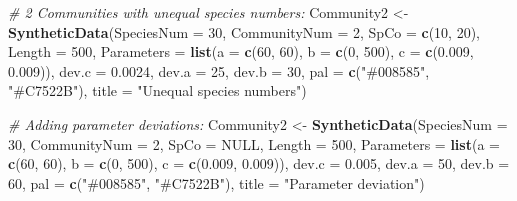 \documentclass[
]{article}
\newenvironment{Shaded}{\begin{snugshade}}{\end{snugshade}}
\newcommand{\CommentTok}[1]{\textcolor[rgb]{0.56,0.35,0.01}{\textit{#1}}}
\newcommand{\DataTypeTok}[1]{\textcolor[rgb]{0.13,0.29,0.53}{#1}}
\newcommand{\DecValTok}[1]{\textcolor[rgb]{0.00,0.00,0.81}{#1}}
\newcommand{\FloatTok}[1]{\textcolor[rgb]{0.00,0.00,0.81}{#1}}
\newcommand{\KeywordTok}[1]{\textcolor[rgb]{0.13,0.29,0.53}{\textbf{#1}}}
\newcommand{\NormalTok}[1]{#1}
\newcommand{\OtherTok}[1]{\textcolor[rgb]{0.56,0.35,0.01}{#1}}
\newcommand{\StringTok}[1]{\textcolor[rgb]{0.31,0.60,0.02}{#1}}
\begin{document}
\begin{Shaded}
\begin{Highlighting}[]
\CommentTok{\# 2 Communities with unequal species numbers:}
\NormalTok{Community2 \textless{}{-}}\StringTok{ }\KeywordTok{SyntheticData}\NormalTok{(}\DataTypeTok{SpeciesNum =} \DecValTok{30}\NormalTok{, }\DataTypeTok{CommunityNum =} \DecValTok{2}\NormalTok{, }\DataTypeTok{SpCo =} \KeywordTok{c}\NormalTok{(}\DecValTok{10}\NormalTok{, }
    \DecValTok{20}\NormalTok{), }\DataTypeTok{Length =} \DecValTok{500}\NormalTok{, }\DataTypeTok{Parameters =} \KeywordTok{list}\NormalTok{(}\DataTypeTok{a =} \KeywordTok{c}\NormalTok{(}\DecValTok{60}\NormalTok{, }\DecValTok{60}\NormalTok{), }\DataTypeTok{b =} \KeywordTok{c}\NormalTok{(}\DecValTok{0}\NormalTok{, }\DecValTok{500}\NormalTok{), }
    \DataTypeTok{c =} \KeywordTok{c}\NormalTok{(}\FloatTok{0.009}\NormalTok{, }\FloatTok{0.009}\NormalTok{)), }\DataTypeTok{dev.c =} \FloatTok{0.0024}\NormalTok{, }\DataTypeTok{dev.a =} \DecValTok{25}\NormalTok{, }\DataTypeTok{dev.b =} \DecValTok{30}\NormalTok{, }\DataTypeTok{pal =} \KeywordTok{c}\NormalTok{(}\StringTok{"\#008585"}\NormalTok{, }
    \StringTok{"\#C7522B"}\NormalTok{), }\DataTypeTok{title =} \StringTok{"Unequal species numbers"}\NormalTok{)}

\CommentTok{\# Adding parameter deviations:}
\NormalTok{Community2 \textless{}{-}}\StringTok{ }\KeywordTok{SyntheticData}\NormalTok{(}\DataTypeTok{SpeciesNum =} \DecValTok{30}\NormalTok{, }\DataTypeTok{CommunityNum =} \DecValTok{2}\NormalTok{, }\DataTypeTok{SpCo =} \OtherTok{NULL}\NormalTok{, }
    \DataTypeTok{Length =} \DecValTok{500}\NormalTok{, }\DataTypeTok{Parameters =} \KeywordTok{list}\NormalTok{(}\DataTypeTok{a =} \KeywordTok{c}\NormalTok{(}\DecValTok{60}\NormalTok{, }\DecValTok{60}\NormalTok{), }\DataTypeTok{b =} \KeywordTok{c}\NormalTok{(}\DecValTok{0}\NormalTok{, }\DecValTok{500}\NormalTok{), }\DataTypeTok{c =} \KeywordTok{c}\NormalTok{(}\FloatTok{0.009}\NormalTok{, }
        \FloatTok{0.009}\NormalTok{)), }\DataTypeTok{dev.c =} \FloatTok{0.005}\NormalTok{, }\DataTypeTok{dev.a =} \DecValTok{50}\NormalTok{, }\DataTypeTok{dev.b =} \DecValTok{60}\NormalTok{, }\DataTypeTok{pal =} \KeywordTok{c}\NormalTok{(}\StringTok{"\#008585"}\NormalTok{, }
        \StringTok{"\#C7522B"}\NormalTok{), }\DataTypeTok{title =} \StringTok{"Parameter deviation"}\NormalTok{)}


\end{Highlighting}
\end{Shaded}
\end{document}
